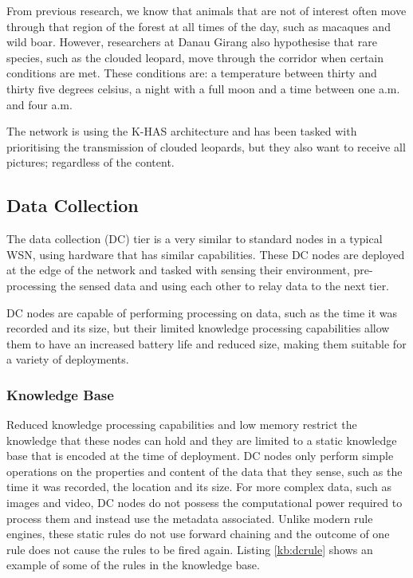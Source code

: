 		From previous research, we know that animals that are not of interest often move through that region of the forest at all times of the day, such as macaques and wild boar. However, researchers at Danau Girang also hypothesise that rare species, such as the clouded leopard, move through the corridor when certain conditions are met. These conditions are: a temperature between thirty and thirty five degrees celsius, a night with a full moon and a time between one a.m. and four a.m.

		The network is using the K-HAS architecture and has been tasked with prioritising the transmission of clouded leopards, but they also want to receive all pictures; regardless of the content.
	
	\subsection{Data Collection}
	The data collection (DC) tier is a very similar to standard nodes in a typical WSN, using hardware that has similar capabilities. These DC nodes are deployed at the edge of the network and tasked with sensing their environment, pre-processing the sensed data and using each other to relay data to the next tier.

	DC nodes are capable of performing processing on data, such as the time it was recorded and its size, but their limited knowledge processing capabilities allow them to have an increased battery life and reduced size, making them suitable for a variety of deployments.

	\subsubsection{Knowledge Base}
	Reduced knowledge processing capabilities and low memory restrict the knowledge that these nodes can hold and they are limited to a static knowledge base that is encoded at the time of deployment. DC nodes only perform simple operations on the properties and content of the data that they sense, such as the time it was recorded, the location and its size. For more complex data, such as images and video, DC nodes do not possess the computational power required to process them and instead use the metadata associated.
	Unlike modern rule engines, these static rules do not use forward chaining and the outcome of one rule does not cause the rules to be fired again. Listing \ref{kb:dcrule} shows an example of some of the rules in the knowledge base.

